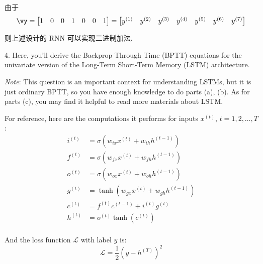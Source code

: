 \documentclass[openany]{ctexbook}
\theoremstyle{kaiti}
\theoremstyle{normal}
\begin{document}
由于
\begin{equation}
  \vy
  =\begin{bmatrix}
    1 & 0 & 0 & 1 & 0 & 0 & 1 \\
  \end{bmatrix}
  =\begin{bmatrix}
    y^{(1)} & y^{(2)} & y^{(3)} & y^{(4)} & y^{(5)} & y^{(6)} & y^{(7)} \\
  \end{bmatrix}
\end{equation}

则上述设计的 RNN 可以实现二进制加法.

4. Here, you'll derive the Backprop Through Time (BPTT) equations for the univariate version of the Long-Term Short-Term Memory (LSTM) architecture.

\emph{Note}: This question is an important context for understanding LSTMs, but it is just ordinary BPTT, so you have enough knowledge to do parts (a), (b). As for parts (c), you may find it helpful to read more materials about LSTM.

For reference, here are the computations it performs for inputs $x^{(t)}$, $t=1,2,\dots,T$:
\begin{equation}
  \begin{aligned}
      i^{(t)}&=\sigma\left(w_{i x} x^{(t)}+w_{i h} h^{(t-1)}\right) \\ 
      f^{(t)}&=\sigma\left(w_{f x} x^{(t)}+w_{f h} h^{(t-1)}\right) \\ 
      o^{(t)}&=\sigma\left(w_{o x} x^{(t)}+w_{o h} h^{(t-1)}\right) \\ 
      g^{(t)}&=\tanh\left(w_{g x} x^{(t)}+w_{g h} h^{(t-1)}\right) \\ 
      c^{(t)}&=f^{(t)} c^{(t-1)}+i^{(t)}g^{(t)} \\ 
      h^{(t)}&=o^{(t)}\tanh\left(c^{(t)}\right)\\
  \end{aligned}
\end{equation}

And the loss function $\mathcal{L}$ with label $y$ is:
\begin{equation}
  \mathcal{L} = \frac{1}{2}\left(y-h^{(T)}\right)^2
\end{equation}
\end{document}
